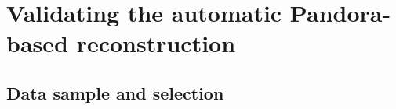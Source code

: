 
\chapter{Validating the automatic Pandora-based reconstruction}\label{chap:methods}


\section{Data sample and selection}

\section{}